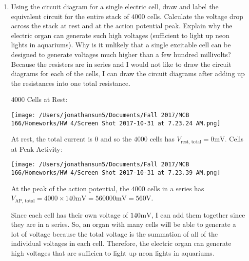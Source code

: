 \documentclass[11pt]{article}
\begin{document}
\begin{enumerate}[label=\arabic*.]
\begin{enumerate}[label=(\alph*)]
\begin{multicols}{2}
\begin{center}
\end{center}
\begin{align*}
V_{b \to a} &= E_{\ch{Na}} = 50 \text{mV} \\
V_{c \to a} &= V_{c \to b} + V_{b \to a} \\
&= -(-90 \text{mV}) + 50 \text{mV} \\
&= 140 \text{mV}
\end{align*}
\end{multicols}
Amplitude of the Action Potential:
\begin{align*}
\text{Amplitude of AP}_{a \to b} = \abs{-50 \text{mV} - 90 \text{mV}} = 140 \text{mV}
\end{align*}
\begin{align*}
\text{Amplitude of AP}_{a \to c} = \abs{-140 \text{mV} - 0 \text{mV}} = 140 \text{mV}
\end{align*}



\item
Using the circuit diagram for a single electric cell, draw and label the equivalent circuit for the entire stack of $4000$ cells. Calculate the voltage drop across the stack at rest and at the action potential peak. Explain why the electric organ can generate such high voltages (sufficient to light up neon lights in aquariums). Why is it unlikely that a single excitable cell can be designed to generate voltages much higher than a few hundred millivolts?
\vspace*{1\baselineskip}
\\
Because the resisters are in series and I would not like to draw the circuit diagrams for each of the cells, I can draw the circuit diagrams after adding up the resistances into one total resistance.
\begin{multicols}{2}
4000 Cells at Rest:
\begin{center}
\texttt{[image: /Users/jonathansun5/Documents/Fall 2017/MCB 166/Homeworks/HW 4/Screen Shot 2017-10-31 at 7.23.24 AM.png]}
\end{center}
At rest, the total current is $0$ and so the $4000$ cells has $V_{\text{rest, total}} = 0 \text{mV}$.
 Cells at Peak Activity:
\begin{center}
\texttt{[image: /Users/jonathansun5/Documents/Fall 2017/MCB 166/Homeworks/HW 4/Screen Shot 2017-10-31 at 7.23.39 AM.png]}
\end{center}
At the peak of the action potential, the $4000$ cells in a series has $V_{\text{AP, total}} = 4000 \times 140 \text{mV} = 560000 \text{mV} = 560 \text{V}$.
\end{multicols}
Since each cell has their own voltage of $140 \text{mV}$, I can add them together since they are in a series. So, an organ with many cells will be able to generate a lot of voltage because the total voltage is the summation of all of the individual voltages in each cell. Therefore, the electric organ can generate high voltages that are sufficien to light up neon lights in aquariums.
\\




\end{enumerate}
\end{enumerate}
\end{document}
